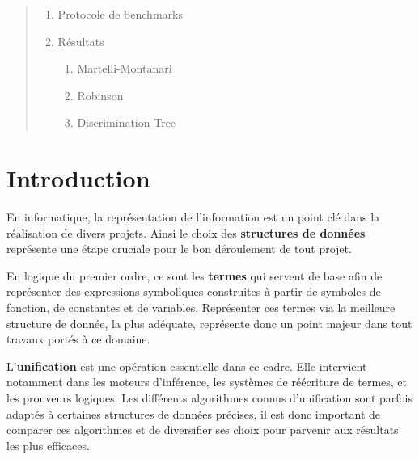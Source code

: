 \documentclass[11pt]{article}
\begin{document}
\begin{titlepage}
\begin{center}
\begin{minipage}{0.8\textwidth}
\begin{quote}
\begin{enumerate}[label=\arabic*., leftmargin=1.5em, itemsep=0.1em]
                    \item Protocole de benchmarks
                    \item Résultats
                    \begin{enumerate}[label=\alph*., leftmargin=1.5em, itemsep=0em]
                        \item Martelli-Montanari
                        \item Robinson
                        \item Discrimination Tree
                    \end{enumerate}
                \end{enumerate}
            \end{quote}

            \vspace{0.5cm}
             \dotfill \pageref{conclusion}
        \end{minipage}
    \end{center}

    \vspace*{\fill} %
\end{titlepage}

\newpage
\section*{Introduction}
\label{introduction}

En informatique, la représentation de l'information est un point clé dans la réalisation de divers projets. Ainsi le choix des \textbf{structures de données} représente une étape cruciale pour le bon déroulement de tout projet. 

En logique du premier ordre, ce sont les \textbf{termes} qui servent de base afin de représenter des expressions symboliques construites à partir de symboles de fonction, de constantes et de variables. Représenter ces termes via la meilleure structure de donnée, la plus adéquate, représente donc un point majeur dans tout travaux portés à ce domaine.

L’\textbf{unification} est une opération essentielle dans ce cadre. Elle intervient notamment dans les moteurs d’inférence, les systèmes de réécriture de termes, et les prouveurs logiques. Les différents algorithmes connus d'unification sont parfois adaptés à certaines structures de données précises, il est donc important de comparer ces algorithmes et de diversifier ses choix pour parvenir aux résultats les plus efficaces.
\end{document}
